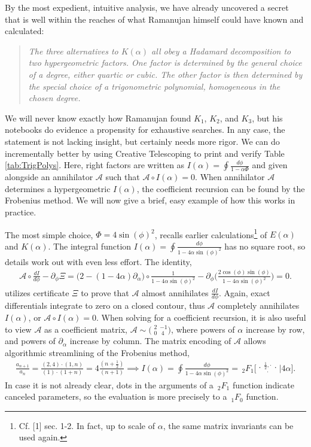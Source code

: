 \documentclass[nofootinbib,preprint]{revtex4-1}
\newcommand{\tFo}[3]{\,_2F_1 \bigg[ 
\genfrac..{0pt}{}{#1}{#2}\bigg| #3 \bigg]}
\begin{document}
By the most expedient, intuitive analysis, we have already uncovered a secret that 
is well within the reaches of what Ramanujan himself could have known and calculated:
\begin{quote}
\textit{The three alternatives to $K(\alpha)$ all obey a Hadamard decomposition to two hypergeometric
factors. One factor is determined by the general choice of a degree, either quartic or cubic. 
The other factor is then determined by the special choice of a trigonometric polynomial, 
homogeneous in the chosen degree.} 
\end{quote}
We will never know exactly how Ramanujan found $K_1$, $K_2$, and $K_3$, but his notebooks 
do evidence a propensity for exhaustive searches. In any case, the statement is not lacking 
insight, but certainly needs more rigor. We can do incrementally better by using Creative 
Telescoping to print and verify Table \ref{tab:TrigPolys}. Here, right factors are written as 
$I(\alpha)=\oint\frac{d\phi}{1-\alpha\Phi}$ and given alongside an annihilator 
$\mathcal{A}$ such that $\mathcal{A} \circ I(\alpha)=0$. 
When annihilator $\mathcal{A}$ determines a hypergeometric $I(\alpha)$, the 
coefficient recursion can be found by the Frobenius method. We will now give 
a brief, easy example of how this works in practice.  

The most simple choice, $\Phi=4\sin(\phi)^2$, recalls earlier calculations\footnote{Cf. 
[1] sec. 1-2. In fact, up to scale of $\alpha$, the same matrix invariants can be used again.} 
of $E(\alpha)$ and $K(\alpha)$. The integral function 
$I(\alpha)=\oint\frac{d\phi}{1-4\alpha\sin(\phi)^2}$
has no square root, so details work out with even less effort. The identity,
\begin{eqnarray}
\mathcal{A}\circ \frac{dI}{d\phi}-\partial_{\phi}\Xi
=\Big(2-(1-4\alpha)\partial_{\alpha} \Big) \circ \frac{1}{1-4 \alpha \sin(\phi)^2}
-\partial_{\phi}\bigg( \frac{2\cos(\phi)\sin(\phi)}{1-4 \alpha \sin(\phi)^2}\bigg) = 0.
\nonumber
\end{eqnarray}
utilizes certificate $\Xi$ to prove that $\mathcal{A}$ almost annihilates
$\frac{dI}{d\phi}$. Again, exact differentials integrate to zero on a closed 
contour, thus $\mathcal{A}$ completely annihilates $I(\alpha)$, or $\mathcal{A} \circ I(\alpha)=0$.  
When solving for a coefficient recursion, it is also useful to view 
$\mathcal{A}$ as a coefficient matrix, $\mathcal{A}\sim \big(\;^{2}_{0}\;^{-1}_{\;4}\big)$, 
where powers of $\alpha$ increase by row, and powers of $\partial_{\alpha}$ increase by
column. The matrix encoding of $\mathcal{A}$ allows algorithmic streamlining of the Frobenius method,
\begin{eqnarray}
\frac{a_{n+1}}{a_n} = \frac{(2,4)\cdot(1,n)}{(1)\cdot(1+n)} = 4\frac{(n+\tfrac{1}{2})}{(n+1)} \implies
I(\alpha)=\oint\frac{d\phi}{1-4 \alpha \sin(\phi)^2}=\tFo{\frac{1}{2},\cdot}{\cdot}{4 \alpha}. \nonumber
\end{eqnarray}
In case it is not already clear, dots in the arguments of a $\,_2F_1$ function indicate 
canceled parameters, so the evaluation is more precisely to a $\,_1F_0$ function. 
\FloatBarrier
\end{document}
